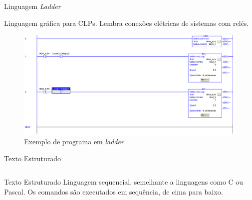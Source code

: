 \documentclass[10pt]{beamer}
\begin{document}
\begin{frame}[fragile]{Linguagem \textit{Ladder}}
\begin{block}{}
Linguagem gráfica para CLPs. Lembra conexões elétricas de sistemas com relés.

\begin{figure}[!ht]
	\centering
	\includegraphics[width=.9\linewidth]{figures/fundamentos/motionladder}
	\caption{Exemplo de programa em \textit{ladder}}
	\label{laddersample}
\end{figure}
\end{block}
\end{frame}

\begin{frame}[fragile]{Texto Estruturado}

\begin{columns}[T]

\begin{column}{.5\textwidth}
\begin{block}{Texto Estruturado}
Linguagem sequencial, semelhante a linguagens como C ou Pascal. Os comandos são executados em sequência, de cima para baixo.
\end{block}
\end{column}

\begin{column}{.5\textwidth}

\end{column}

\end{columns}

\end{frame}
\end{document}
